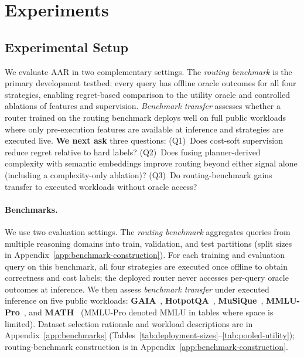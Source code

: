 \section{Experiments}
\label{sec:experiments}

\subsection{Experimental Setup}
\label{sec:experiments-setup}

We evaluate AAR in two complementary settings.
The \emph{routing benchmark} is the primary development testbed: every query has offline
oracle outcomes for all four strategies, enabling regret-based comparison to the utility
oracle and controlled ablations of features and supervision.
\emph{Benchmark transfer} assesses whether a router trained on the routing benchmark deploys
well on full public workloads where only pre-execution features are available at inference and
strategies are executed live.
\textbf{We next ask} three questions:
(Q1)~Does cost-soft supervision reduce regret relative to hard labels?
(Q2)~Does fusing planner-derived complexity with semantic embeddings improve routing
beyond either signal alone (including a complexity-only ablation)?
(Q3)~Do routing-benchmark gains transfer to executed workloads without oracle access?

\paragraph{Benchmarks.}
We use two evaluation settings.
The \emph{routing benchmark} aggregates queries from multiple reasoning domains into
train, validation, and test partitions (split sizes in Appendix~\ref{app:benchmark-construction}).
For each training and evaluation query on this benchmark, all four strategies are executed
once offline to obtain correctness and cost labels; the deployed router never accesses
per-query oracle outcomes at inference.
We then assess \emph{benchmark transfer} under executed inference on five public workloads:
\textbf{GAIA}~\citep{mialon2023gaia}, \textbf{HotpotQA}~\citep{yang2018hotpotqa},
\textbf{MuSiQue}~\citep{trivedi2022musique}, \textbf{MMLU-Pro}~\citep{wang2024mmlupro},
and \textbf{MATH}~\citep{hendrycks2021math} (MMLU-Pro denoted MMLU in tables where space is limited).
Dataset selection rationale and workload descriptions are in
Appendix~\ref{app:benchmarks} (Tables~\ref{tab:deployment-sizes}--\ref{tab:pooled-utility});
routing-benchmark construction is in Appendix~\ref{app:benchmark-construction}.

